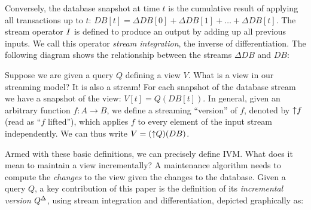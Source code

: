 Conversely, the database snapshot at time $t$ is the cumulative result
of applying all transactions up to $t$: $DB[t] = \Delta DB[0] + \Delta
DB[1] + \ldots + \Delta DB[t]$.  The stream operator $\mathit{I}$ is defined
to produce an output by adding up all previous inputs.  We call this
operator \emph{stream integration}, the inverse of differentiation.
The following diagram shows the relationship between the streams
$\Delta DB$ and $DB$:
\begin{center}
\end{center}

Suppose we are given a query $Q$ defining a view $V$.  What is a view
in our streaming model?  It is also a stream!  For each snapshot of
the database stream we have a snapshot of the view: $V[t] = Q(DB[t])$.
In general, given an arbitrary function $f: A \to B$, we define a
streaming ``version'' of $f$, denoted by ${\uparrow}f$ (read as ``$f$
lifted''), which applies $f$ to every element of the input stream
independently.  We can thus write $V = ({\uparrow}Q)(DB)$.

Armed with these basic definitions, we can precisely define IVM.  What
does it mean to maintain a view incrementally?  A maintenance
algorithm needs to compute the \emph{changes} to the view given the
changes to the database. Given a query $Q$, a key contribution of this
paper is the definition of its \emph{incremental version} ${Q}^{\Delta}$,
using stream integration and differentiation, depicted graphically as:

\begin{center}
\end{center}

